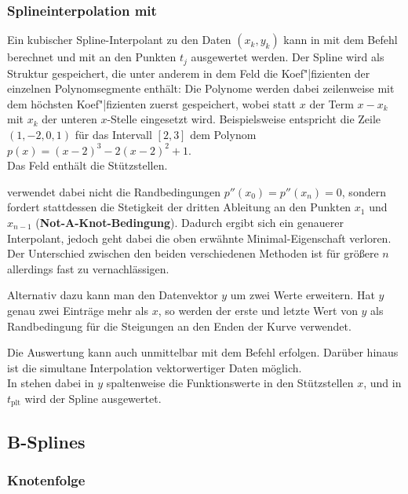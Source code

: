 \subsubsection{%
    Splineinterpolation mit \matlab{}%
}

Ein kubischer Spline-Interpolant zu den Daten $(x_k, y_k)$ kann in \matlab{}
mit dem Befehl \\
 berechnet
und mit  an den Punkten $t_j$ ausgewertet werden.
Der Spline wird als Struktur gespeichert, die unter anderem in dem Feld
 die Koef"|fizienten der einzelnen Polynomsegmente enthält:
Die Polynome werden dabei zeilenweise mit dem höchsten Koef"|fizienten zuerst
gespeichert, wobei statt $x$ der Term $x - x_k$ mit $x_k$ der unteren
$x$-Stelle eingesetzt wird.
Beispielsweise entspricht die Zeile $(1, -2, 0, 1)$ für das Intervall $[2, 3]$
dem Polynom $p(x) = (x - 2)^3 - 2(x - 2)^2 + 1$. \\
Das Feld  enthält die Stützstellen.

\matlab{} verwendet dabei nicht die Randbedingungen $p''(x_0) = p''(x_n) = 0$,
sondern fordert stattdessen die Stetigkeit der dritten Ableitung an den Punkten
$x_1$ und $x_{n-1}$ (\textbf{Not-A-Knot-Bedingung}).
Dadurch ergibt sich ein genauerer Interpolant, jedoch geht dabei die oben
erwähnte Minimal-Eigenschaft verloren.
Der Unterschied zwischen den beiden verschiedenen Methoden ist für
größere $n$ allerdings fast zu vernachlässigen.

Alternativ dazu kann man den Datenvektor $y$ um zwei Werte erweitern.
Hat $y$ genau zwei Einträge mehr als $x$, so werden der erste und letzte Wert
von $y$ als Randbedingung für die Steigungen an den Enden der Kurve verwendet. 

Die Auswertung kann auch unmittelbar mit dem Befehl  erfolgen.
Darüber hinaus ist die simultane Interpolation vektorwertiger Daten möglich. \\
In  stehen dabei in $y$ spaltenweise die
Funktionswerte in den Stützstellen $x$, und in $t_\text{plt}$ wird der Spline
ausgewertet.

\pagebreak

\subsection{%
    B-Splines%
}

\subsubsection{%
    Knotenfolge
}

